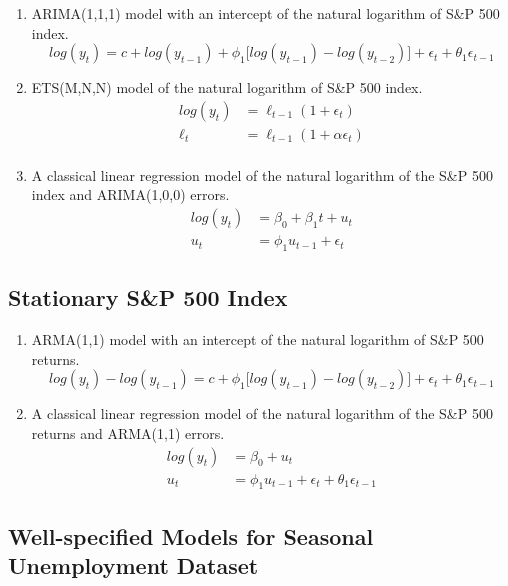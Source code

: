 \documentclass{monashthesis}
\begin{document}
\begin{enumerate}
\def\labelenumi{\arabic{enumi}.}
\item
  ARIMA(1,1,1) model with an intercept of the natural logarithm of S\&P 500 index.
  \begin{equation*}
  log(y_t) = c + log(y_{t-1}) + \phi_1\big[log(y_{t-1})-log(y_{t-2})\big] + \epsilon_t + \theta_1\epsilon_{t-1}
  \end{equation*}
\item
  ETS(M,N,N) model of the natural logarithm of S\&P 500 index.
  \begin{align*}
  log(y_t) &= \ell_{t-1} (1+\epsilon_t) \\
  \ell_t &= \ell_{t-1} (1+\alpha \epsilon_t) \\
  \end{align*}
\item
  A classical linear regression model of the natural logarithm of the S\&P 500 index and ARIMA(1,0,0) errors.
  \begin{align*}
  log(y_t) &= \beta_0 + \beta_1 t + u_t \\
  u_t &= \phi_1 u_{t-1} + \epsilon_t
  \end{align*}
\end{enumerate}

\hypertarget{stationary-sp-500-index}{%
\subsection{Stationary S\&P 500 Index}\label{stationary-sp-500-index}}

\begin{enumerate}
\def\labelenumi{\arabic{enumi}.}
\item
  ARMA(1,1) model with an intercept of the natural logarithm of S\&P 500 returns.
  \begin{equation*}
  log(y_t) - log(y_{t-1}) = c + \phi_1\big[log(y_{t-1})-log(y_{t-2})\big] + \epsilon_t + \theta_1\epsilon_{t-1}
  \end{equation*}
\item
  A classical linear regression model of the natural logarithm of the S\&P 500 returns and ARMA(1,1) errors.
  \begin{align*}
  log(y_t) &= \beta_0 + u_t \\
  u_t &= \phi_1 u_{t-1} + \epsilon_t + \theta_1\epsilon_{t-1}
  \end{align*}
\end{enumerate}

\hypertarget{well-specified-models-for-seasonal-unemployment-dataset}{%
\subsection{Well-specified Models for Seasonal Unemployment Dataset}\label{well-specified-models-for-seasonal-unemployment-dataset}}
\end{document}
